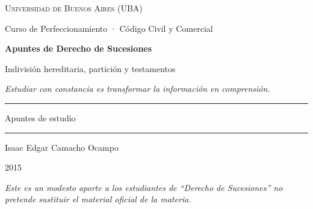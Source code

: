 \documentclass[12pt,oneside]{book}
\newcommand{\universidad}{Universidad de Buenos Aires (UBA)}
\newcommand{\curso}{Curso de Perfeccionamiento · Código Civil y Comercial}
\newcommand{\materia}{Derecho de Sucesiones}
\newcommand{\titulo}{Apuntes de Derecho de Sucesiones}
\newcommand{\subtitulo}{Indivisión hereditaria, partición y testamentos}
\newcommand{\autor}{Isaac Edgar Camacho Ocampo}
\newcommand{\anio}{2015}
\newcommand{\reflexion}{Estudiar con constancia es transformar la información en comprensión.}
\begin{document}

\begin{titlepage}

\thispagestyle{empty}

\begin{center}

\vspace*{1cm}

{\large \textsc{\universidad}}

\vspace{0.2cm}

{\large \curso}

\vspace{3cm}

{\Huge \textbf{\titulo}}

\vspace{1cm}

{\LARGE \subtitulo}

\vspace{0.8cm}

\small\textit{\reflexion}\normalsize

\vspace{1.2cm}

\rule{0.70\textwidth}{0.5pt}

\vspace{0.5cm}

{\large Apuntes de estudio}

\vspace{0.5cm}

\rule{0.70\textwidth}{0.5pt}

\vfill

{\large \autor}

\vspace{0.3cm}

{\large \anio}

\end{center}

\vfill

\begin{flushleft}
\textit{Este es un modesto aporte a los estudiantes de ``\materia'' no pretende sustituir el material oficial de la materia.}
\end{flushleft}

\end{titlepage}

\tableofcontents
\end{document}

